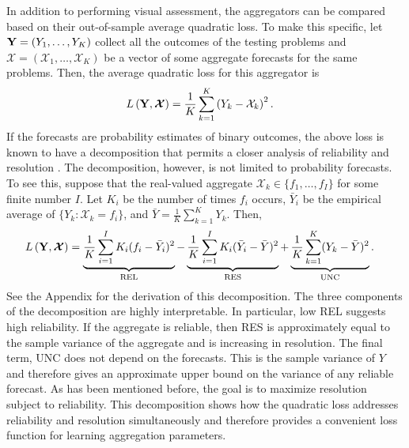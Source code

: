 \documentclass[11pt]{article}
\theoremstyle{definition}
\theoremstyle{definition}
\def\Y{{\bf Y}}
\begin{document}
In addition to performing visual assessment, the aggregators can be compared based on their out-of-sample average quadratic loss. To make this specific, let $\Y = (Y_1, \dots, Y_K)$ collect all the outcomes of the testing problems and $\boldsymbol{\mathcal{X}} = (\mathcal{X}_1, \dots, \mathcal{X}_K)$ be a vector of some aggregate forecasts for the same problems. Then, the average quadratic loss for this aggregator is
\begin{align*}
L\left(\Y, \boldsymbol{\mathcal{X}}\right) &= \frac{1}{K} \sum_{k=1}^K \left(Y_k - \mathcal{X}_k\right)^2.
\end{align*}
If the forecasts are probability estimates of binary outcomes, the above loss is known to have a decomposition that permits a closer analysis of  reliability and resolution \citep{murphy1973new, Brier}. The decomposition, however, is not limited to probability forecasts. To see this, suppose that the real-valued aggregate $\mathcal{X}_k \in \{f_1, \dots, f_I\}$ for some finite number $I$. Let $K_i$ be the number of times $f_i$ occurs, $\bar{Y}_i$ be the empirical average of $\{Y_k : \mathcal{X}_k = f_i\}$, and $\bar{Y} = \frac{1}{K} \sum_{k=1}^K Y_k$. Then,
\begin{align}
L\left(\Y, \boldsymbol{\mathcal{X}} \right)  &= \underbrace{\frac{1}{K} \sum_{i=1}^I K_i(f_i - \bar{Y}_i)^2}_\text{REL} - \underbrace{\frac{1}{K} \sum_{i=1}^I K_i(\bar{Y}_i-\bar{Y})^2}_\text{RES} + \underbrace{\frac{1}{K} \sum_{k=1}^K (Y_k - \bar{Y})^2}_\text{UNC}. \label{decomposition}
\end{align}
See the Appendix for the derivation of this decomposition. The three components of the decomposition are highly interpretable. In particular, low REL suggests high reliability. If the aggregate is reliable, then RES is approximately equal to the sample variance of the aggregate and 
is increasing in resolution.
The final term, UNC does not depend on the forecasts. This is the sample variance of $Y$ and therefore gives an approximate upper bound on the variance of any reliable forecast. As has been mentioned before, the goal is to maximize resolution subject to reliability. This decomposition shows how the quadratic loss addresses reliability and resolution simultaneously and therefore provides a convenient loss function for learning aggregation parameters. 
\end{document}
